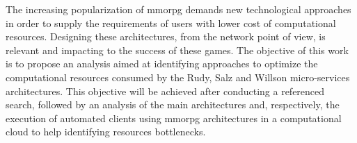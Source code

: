 The increasing popularization of \acf{mmorpg} demands new technological approaches in order to supply the requirements of users with lower cost of computational resources.
%
Designing these architectures, from the network point of view, is relevant and impacting to the success of these games.
%
The objective of this work is to propose an analysis aimed at identifying approaches to optimize the computational resources consumed by the Rudy, Salz and Willson micro-services architectures.
%
This objective will be achieved after conducting a referenced search, followed by an analysis of the main architectures and, respectively, the execution of automated clients using \ac{mmorpg} architectures in a computational cloud to help identifying resources bottlenecks.
%
\\
